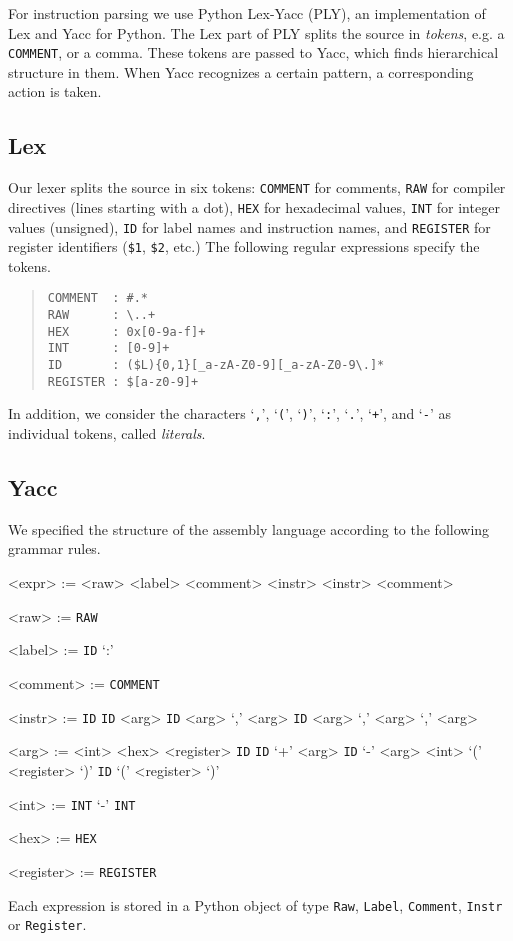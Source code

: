 For instruction parsing we use Python Lex-Yacc (PLY), an implementation of Lex and Yacc for Python. The Lex part of PLY splits the source in \emph{tokens}, e.g. a \verb!COMMENT!, or a comma. These tokens are passed to Yacc, which finds hierarchical structure in them. When Yacc recognizes a certain pattern, a corresponding action is taken.

\subsection{Lex}

Our lexer splits the source in six tokens: \verb!COMMENT! for comments, \verb!RAW! for compiler directives (lines starting with a dot), \verb!HEX! for hexadecimal values, \verb!INT! for integer values (unsigned), \verb!ID! for label names and instruction names, and \verb!REGISTER! for register identifiers (\verb!$1!, \verb!$2!, etc.)
The following regular expressions specify the tokens.
\begin{quote}
\begin{verbatim}
COMMENT  : #.*
RAW      : \..+
HEX      : 0x[0-9a-f]+
INT      : [0-9]+
ID       : ($L){0,1}[_a-zA-Z0-9][_a-zA-Z0-9\.]*
REGISTER : $[a-z0-9]+
\end{verbatim}
\end{quote}
In addition, we consider the characters `\verb!,!', `\verb!(!', `\verb!)!', `\verb!:!', `\verb!.!', `\verb!+!', and `\verb!-!' as individual tokens, called \emph{literals}.

\subsection{Yacc}
We specified the structure of the assembly language according to the following grammar rules.

\begin{grammar}
<expr> := <raw>
\alt <label>
\alt <comment>
\alt <instr>
\alt <instr> <comment>

<raw> := \verb!RAW!

<label> := \verb!ID! `:'

<comment> := \verb!COMMENT!

<instr> := \verb!ID!
\alt \verb!ID! <arg>
\alt \verb!ID! <arg> `,' <arg>
\alt \verb!ID! <arg> `,' <arg> `,' <arg>

<arg> := <int>
\alt <hex>
\alt <register>
\alt \verb!ID!
\alt \verb!ID! `+' <arg>
\alt \verb!ID! `-' <arg>
\alt <int> `(' <register> `)'
\alt \verb!ID!  `(' <register> `)'

<int> := \verb!INT!
\alt `-' \verb!INT!

<hex> := \verb!HEX!

<register> := \verb!REGISTER!
\end{grammar}

Each expression is stored in a Python object of type \verb!Raw!, \verb!Label!, \verb!Comment!, \verb!Instr! or \verb!Register!.